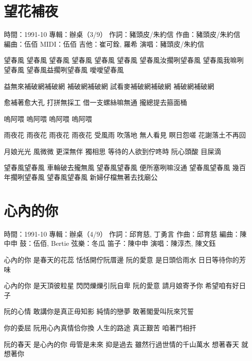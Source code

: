 \documentclass[UTF8,a4paper,oneside,twocolumn,12pt]{ctexbook}
\newcommand{\infopair}[2]{\textbullet #1：#2}
\newcommand{\zc}[1][伍佰]{\infopair{作詞}{#1}}
\newcommand{\zq}[1][伍佰]{\infopair{作曲}{#1}}
\newcommand{\bq}[1][伍佰]{\infopair{編曲}{#1}}
\newcommand{\zj}[1]{\infopair{專輯}{#1}}
\newcommand{\sj}[1]{\infopair{時間}{#1}}
\newenvironment{info}{\begin{flushleft}\kaishu
	}
	{\end{flushleft}\normalsize\yahei\par}
\newenvironment{lyric}{
	}
{}
\begin{document}
\section{望花補夜}
\begin{info}
	\sj{1991-10}
	\zj{辦桌（3/9）}
	\zc[豬頭皮/朱約信]
	\zq[豬頭皮/朱約信]
	\bq[伍佰]
	\infopair{MIDI}{伍佰}
	\infopair{吉他}{崔可銓, 羅希}
	\infopair{演唱}{豬頭皮/朱約信}
\end{info}
\begin{lyric}
	望春風 望春風
	望春風 望春風
	望春風 望春風
	望春風汝擱咧望春風
	望春風我嘛咧望春風
	望春風益擱咧望春風
	噯噯望春風

	益無來補破網補破網
	補破網補破網
	試看麥補破網補破網
	補破網補破網

	愈補著愈大孔 打拼無採工
	借一支螺絲嘛無通
	攏總提去箍面桶

	嗚阿喂 嗚阿喂
	嗚阿喂 嗚阿喂

	雨夜花 雨夜花 雨夜花
	雨夜花 受風雨
	吹落地 無人看見
	瞑日怨嗟
	花謝落土不再回

	月娘光光 風微微
	更深無伴 獨相思
	等待的人欲到佇咚時
	阮心頭酸 目屎滴

	望春風望春風 車輪破去攏無風
	望春風望春風 便所塞咧嘛沒通
	望春風望春風 幾百年擱咧望春風
	望春風望春風 新婦仔檔無著去找廟公
\end{lyric}

\section{心內的你}
\begin{info}
	\sj{1991-10}
	\zj{辦桌（4/9）}
	\zc[邱育慈, 丁勇言]
	\zq[邱育慈]
	\bq[陳中申]
	\infopair{鼓}{伍佰, Bertie}
	\infopair{弦樂}{冬瓜}
	\infopair{笛子}{陳中申}
	\infopair{演唱}{陳淳杰, 陳文鈺}
\end{info}
\begin{lyric}
	心內的你 是春天的花蕊
	恬恬開佇阮厝邊
	阮的愛意 是日頭佮雨水
	日日等待你的芳味

	心內的你 是天頂彼粒星
	閃閃爍爍引阮自卑
	阮的愛意 請月娘寄予你
	希望咱有好日子

	阮的心情 敢講你是真正毋知影
	純情的戀夢 敢著閣愛叫阮來咒誓

	你的委屈 阮用心內真情佮你換
	人生的路途 真正艱苦 咱著鬥相扞

	阮的春天 是心內的你
	毋管是未來 抑是過去
	雖然行過世情的千山萬水
	想著春天 就想著你
\end{lyric}
\end{document}
